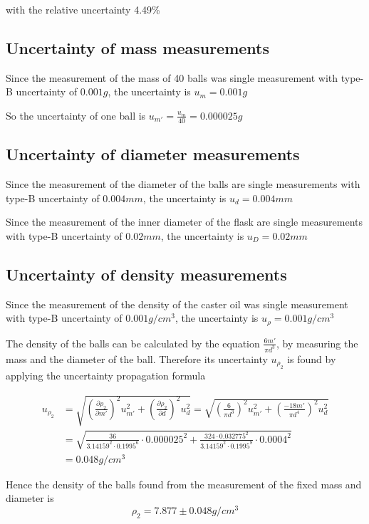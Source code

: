 \documentclass{article}
\begin{document}
with the relative uncertainty 4.49\%

\subsection{Uncertainty of mass measurements}
Since the measurement of the mass of 40 balls was single measurement with type-B uncertainty of $0.001g$, the uncertainty is $u_m=0.001g$

So the uncertainty of one ball is $u_{m'}=\frac{u_m}{40}=0.000025g$

\subsection{Uncertainty of diameter measurements}
Since the measurement of the diameter of the balls are single measurements with type-B uncertainty of $0.004mm$, the uncertainty is $u_d=0.004mm$

Since the measurement of the inner diameter of the flask are single measurements with type-B uncertainty of $0.02mm$, the uncertainty is $u_D=0.02mm$

\subsection{Uncertainty of density measurements}
Since the measurement of the density of the caster oil was single measurement with type-B uncertainty of $0.001g/cm^3$, the uncertainty is $u_{\rho}=0.001g/cm^3$

The density of the balls can be calculated by the equation $\frac{6m'}{\pi d^3}$, by measuring the mass and the diameter of the ball. Therefore its uncertainty $u_{\rho_2}$ is found by applying the uncertainty propagation formula

\begin{align*}
u_{\rho_2}&=\sqrt{\left(\frac{\partial\rho_2}{\partial m'}\right)^2u^2_{m'}+\left(\frac{\partial\rho_2}{\partial d}\right)^2u^2_d}
=\sqrt{\left(\frac{6}{\pi d^3}\right)^2u^2_{m'}+\left(\frac{-18m'}{\pi d^4}\right)^2u^2_d}\\
&=\sqrt{\frac{36}{3.14159^2\cdot 0.1995^6}\cdot 0.000025^2+\frac{324\cdot 0.032775^2}{3.14159^2\cdot 0.1995^8}\cdot 0.0004^2}\\
&=0.048g/cm^3
\end{align*}

Hence the density of the balls found from the measurement of the fixed mass and diameter is
$$\rho_2=7.877\pm0.048g/cm^3$$
\end{document}
